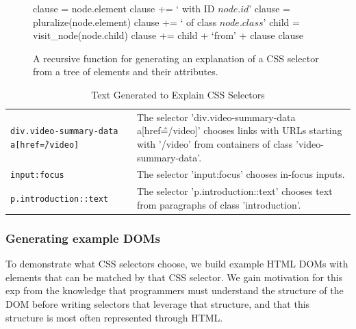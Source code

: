 \begin{figure}
\begin{algorithmic}

        clause = node.element
        \State clause += ` with ID $node.id$'
    \Else
    \State clause = pluralize(node.element)    
        \State clause += ` of class $node.class$'
    \EndIf
    \EndIf
        \State child = visit\_node(node.child)
        \State clause += child + `from' + clause
    \EndIf
    \State \Return clause
\EndFunction

\end{algorithmic}
\caption{A recursive function for generating an explanation of a CSS selector from a tree of elements and their attributes.}
\label{alg:css_traversal}
\end{figure}


\begin{table}[t]
\caption{Text Generated to Explain CSS Selectors}
\label{tab:css_descriptions}
\centering
\begin{tabular}{|S|T|}
\hline
{} &  \\
\hline
\texttt{div.video-summary-data a[href\^=/video]} & The selector 'div.video-summary-data a[href\^=/video]' chooses links with URLs starting with '/video' from containers of class 'video-summary-data'. \\ \hline
\texttt{input:focus} & The selector 'input:focus' chooses in-focus inputs. \\ \hline
\texttt{p.introduction::text} & The selector 'p.introduction::text' chooses text from paragraphs of class 'introduction'. \\ \hline
\end{tabular}
\end{table}

\subsubsection{Generating example DOMs}

To demonstrate what CSS selectors choose, we build example HTML DOMs with elements that can be matched by that CSS selector.
We gain motivation for this \gls{exp} from the knowledge that programmers must understand the structure of the DOM before writing selectors that leverage that structure, and that this structure is most often represented through HTML.

